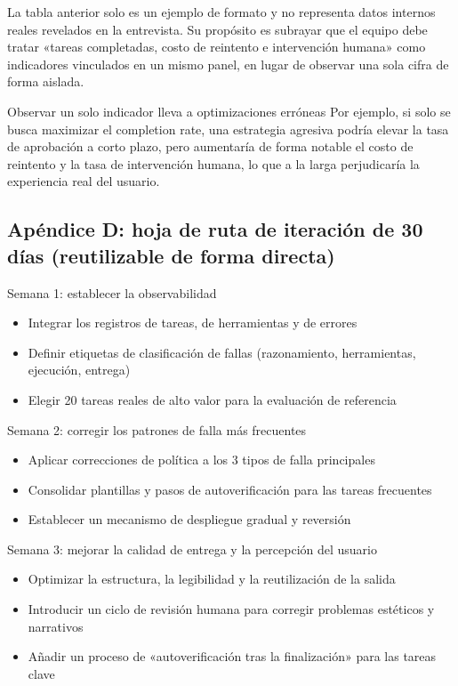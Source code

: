 \documentclass[a4paper]{article}
\begin{document}
La tabla anterior solo es un ejemplo de formato y no representa datos internos reales revelados en la entrevista. Su propósito es subrayar que el equipo debe tratar «tareas completadas, costo de reintento e intervención humana» como indicadores vinculados en un mismo panel, en lugar de observar una sola cifra de forma aislada.

\begin{warningbox}{Observar un solo indicador lleva a optimizaciones erróneas}
Por ejemplo, si solo se busca maximizar el completion rate, una estrategia agresiva podría elevar la tasa de aprobación a corto plazo, pero aumentaría de forma notable el costo de reintento y la tasa de intervención humana, lo que a la larga perjudicaría la experiencia real del usuario.
\end{warningbox}

\subsection{Apéndice D: hoja de ruta de iteración de 30 días (reutilizable de forma directa)}

\begin{knowledgebox}{Semana 1: establecer la observabilidad}
\begin{itemize}
    \item Integrar los registros de tareas, de herramientas y de errores
    \item Definir etiquetas de clasificación de fallas (razonamiento, herramientas, ejecución, entrega)
    \item Elegir 20 tareas reales de alto valor para la evaluación de referencia
\end{itemize}
\end{knowledgebox}

\begin{knowledgebox}{Semana 2: corregir los patrones de falla más frecuentes}
\begin{itemize}
    \item Aplicar correcciones de política a los 3 tipos de falla principales
    \item Consolidar plantillas y pasos de autoverificación para las tareas frecuentes
    \item Establecer un mecanismo de despliegue gradual y reversión
\end{itemize}
\end{knowledgebox}

\begin{knowledgebox}{Semana 3: mejorar la calidad de entrega y la percepción del usuario}
\begin{itemize}
    \item Optimizar la estructura, la legibilidad y la reutilización de la salida
    \item Introducir un ciclo de revisión humana para corregir problemas estéticos y narrativos
    \item Añadir un proceso de «autoverificación tras la finalización» para las tareas clave
\end{itemize}
\end{knowledgebox}
\end{document}
